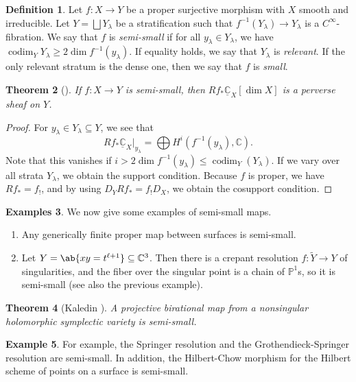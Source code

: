 \documentclass{amsart}
\newtheorem{thm}{Theorem}[section]
\theoremstyle{definition}
\newtheorem{defn}[thm]{Definition}
\newtheorem{exm}[thm]{Example}
\newtheorem{exms}[thm]{Examples}
\theoremstyle{remark}
\theoremstyle{plain}
\theoremstyle{definition}
\theoremstyle{remark}
\newcommand{\C}{\mathbb{C}}
\renewcommand{\P}{\mathbb{P}}
\newcommand{\on}[1]{\operatorname{#1}}
\newcommand{\ul}[1]{\underline{#1}}
\newcommand{\1}{\mathbf{1}}
\newcommand{\2}{\mathbf{2}}
\newcommand{\3}{\mathbf{3}}
\begin{document}
\begin{defn}
    Let \(f \colon X \to Y\) be a proper surjective morphism with \(X\) smooth and irreducible. Let \(Y = \bigsqcup Y_{\lambda}\) be a stratification such that \(f^{-1}(Y_{\lambda}) \to Y_{\lambda}\) is a \(C^{\infty}\)-fibration. We say that \(f\) is \textit{semi-small} if for all \(y_{\lambda} \in Y_{\lambda}\), we have \(\on{codim}_Y Y_{\lambda} \geq 2 \dim f^{-1} (y_{\lambda})\). If equality holds, we say that \(Y_{\lambda}\) is \textit{relevant}. If the only relevant stratum is the dense one, then we say that \(f\) is \textit{small}.
\end{defn}

\begin{thm}[{\cite{DeCataldoMigliorini2002}}]
    If \(f \colon X \to Y\) is semi-small, then \(R f_* \ul{\C}_X [\dim X]\) is a perverse sheaf on \(Y\).
\end{thm}

\begin{proof}
    For \(y_{\lambda} \in Y_{\lambda} \subseteq Y\), we see that
    \[ R f_* \ul{\C}_X |_{y_{\lambda}} = \bigoplus H^i (f^{-1}(y_{\lambda}), \C). \]
    Note that this vanishes if \(i > 2 \dim f^{-1}(y_{\lambda}) \leq \on{codim}_Y (Y_{\lambda})\). If we vary over all strata \(Y_{\lambda}\), we obtain the support condition. Because \(f\) is proper, we have \(R f_* = f_!\), and by using \(D_Y R f_* = f_! D_X\), we obtain the cosupport condition.
\end{proof}

\begin{exms}
    We now give some examples of semi-small maps.
    \begin{enumerate}
        \item Any generically finite proper map between surfaces is semi-small.
        \item Let \(Y = \ab\{xy = t^{\ell+1}\} \subseteq \C^3\). Then there is a crepant resolution \(f \colon \tilde{Y} \to Y\) of singularities, and the fiber over the singular point is a chain of \(\P^1\)s, so it is semi-small (see also the previous example).
    \end{enumerate}
\end{exms}

\begin{thm}[Kaledin {\cite{Kaledin2006}}]
    A projective birational map from a nonsingular holomorphic symplectic variety is semi-small.
\end{thm}

\begin{exm}
    For example, the Springer resolution and the Grothendieck-Springer resolution are semi-small. In addition, the Hilbert-Chow morphism for the Hilbert scheme of points on a surface is semi-small.
\end{exm}
\end{document}
